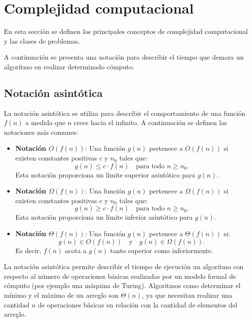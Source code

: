 \documentclass[12pt]{article}
\begin{document}
\section{Complejidad computacional}

En esta sección se definen los principales conceptos de complejidad computacional y las clases de problemas.

A continuación se presenta una notación para describir el tiempo que demora un algoritmo en realizar determinado cómputo.

\subsection{Notación asintótica}

La notación asintótica se utiliza para describir el comportamiento de una función $f(n)$ a medida que $n$ crece hacia el infinito. A continuación se definen las notaciones más comunes:

\begin{itemize}
      \item \textbf{Notación $O(f(n))$}: Una función $g(n)$ pertenece a $O(f(n))$ si existen constantes positivas $c$ y $n_0$ tales que:
            \[
                  g(n) \leq c \cdot f(n) \quad \text{para todo } n \geq n_0.
            \]
            Esta notación proporciona un límite superior asintótico para $g(n)$.
            
      \item \textbf{Notación $\Omega(f(n))$}: Una función $g(n)$ pertenece a $\Omega(f(n))$ si existen constantes positivas $c$ y $n_0$ tales que:
            \[
                  g(n) \geq c \cdot f(n) \quad \text{para todo } n \geq n_0.
            \]
            Esta notación proporciona un límite inferior asintótico para $g(n)$.
            
      \item \textbf{Notación $\Theta(f(n))$}: Una función $g(n)$ pertenece a $\Theta(f(n))$ si:
            \[
                  g(n) \in O(f(n)) \quad \text{y} \quad g(n) \in \Omega(f(n)).
            \]
            Es decir, $f(n)$ acota a $g(n)$ tanto superior como inferiormente.
\end{itemize}

La notación asintótica permite describir el tiempo de ejecución un algoritmo con respecto al número de operaciones 
básicas realizadas por un modelo formal de cómputo (por ejemplo una máquina de Turing). Algoritmos como determinar el mínimo y el máximo de
un arreglo son $\Theta(n)$, ya que necesitan realizar una cantidad $n$ de operaciones básicas en relación con
la cantidad de elementos del arreglo.
\end{document}
